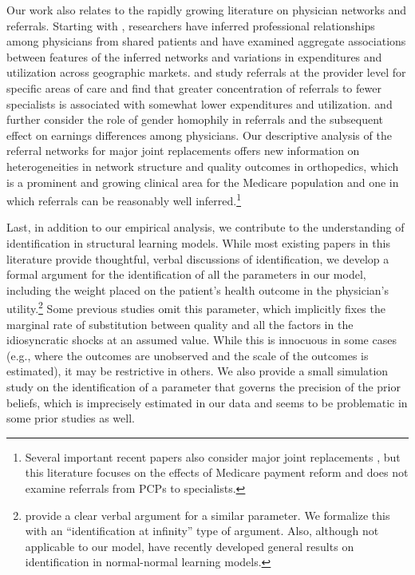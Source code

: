 \documentclass[12pt]{article}
\begin{document}
Our work also relates to the rapidly growing literature on physician networks and referrals. Starting with \cite{barnett2011}, researchers have inferred professional relationships among physicians from shared patients and have examined aggregate associations between features of the inferred networks and variations in expenditures and utilization across geographic markets. \cite*{kaur2016} and \cite*{agha2022ms} study referrals at the provider level for specific areas of care and find that greater concentration of referrals to fewer specialists is associated with somewhat lower expenditures and utilization. \cite{zeltzer2020} and \cite{sarsons2023} further consider the role of gender homophily in referrals and the subsequent effect on earnings differences among physicians. Our descriptive analysis of the referral networks for major joint replacements offers new information on heterogeneities in network structure and quality outcomes in orthopedics, which is a prominent and growing clinical area for the Medicare population and one in which referrals can be reasonably well inferred.\footnote{Several important recent papers also consider major joint replacements \citep*[e.g.,][]{einav2020, einav2022}, but this literature focuses on the effects of Medicare payment reform and does not examine referrals from PCPs to specialists.}

Last, in addition to our empirical analysis, we contribute to the understanding of identification in structural learning models. While most existing papers in this literature provide thoughtful, verbal discussions of identification, we develop a formal argument for the identification of all the parameters in our model, including the weight placed on the patient's health outcome in the physician's utility.\footnote{\cite{ching2013} provide a clear verbal argument for a similar parameter.  We formalize this with an ``identification at infinity'' type of argument. Also, although not applicable to our model, \cite{bunting_heterogeneity_2024} have recently developed general results on identification in normal-normal learning models.} Some previous studies omit this parameter, which implicitly fixes the marginal rate of substitution between quality and all the factors in the idiosyncratic shocks at an assumed value. While this is innocuous in some cases (e.g., where the outcomes are unobserved and the scale of the outcomes is estimated), it may be restrictive in others. We also provide a small simulation study on the identification of a parameter that governs the precision of the prior beliefs, which is imprecisely estimated in our data and seems to be problematic in some prior studies as well.
\end{document}
